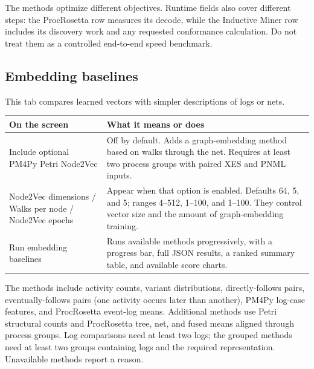 \documentclass[11pt,a4paper]{article}
\makeatletter
\newenvironment{controls}{%
  \small\begin{longtable}{@{}>{\raggedright\arraybackslash}p{.34\linewidth}
    >{\raggedright\arraybackslash}p{.62\linewidth}@{}}
  \toprule\textbf{On the screen} & \textbf{What it means or does}\\\midrule\endhead
  \bottomrule\endfoot
}{\end{longtable}\normalsize}
\makeatother
\begin{document}
The methods optimize different objectives. Runtime fields also cover different
steps: the ProcRosetta row measures its decode, while the Inductive Miner row
includes its discovery work and any requested conformance calculation. Do not
treat them as a controlled end-to-end speed benchmark.

\subsection{Embedding baselines}
This tab compares learned vectors with simpler descriptions of logs or nets.
\begin{controls}
Include optional PM4Py Petri Node2Vec & Off by default. Adds a graph-embedding
method based on walks through the net. Requires at least two process groups
with paired XES and PNML inputs.\\
Node2Vec dimensions / Walks per node / Node2Vec epochs & Appear when that
option is enabled. Defaults 64, 5, and 5; ranges 4--512, 1--100, and 1--100.
They control vector size and the amount of graph-embedding training.\\
Run embedding baselines & Runs available methods progressively, with a progress
bar, full JSON results, a ranked summary table, and available score charts.\\
\end{controls}

The methods include activity counts, variant distributions, directly-follows
pairs, eventually-follows pairs (one activity occurs later than another), PM4Py
log-case features, and ProcRosetta event-log means. Additional methods use
Petri structural counts and ProcRosetta tree, net, and fused means aligned
through process groups. Log comparisons need at least two logs; the grouped
methods need at least two groups containing logs and the required representation.
Unavailable methods report a reason.
\end{document}
